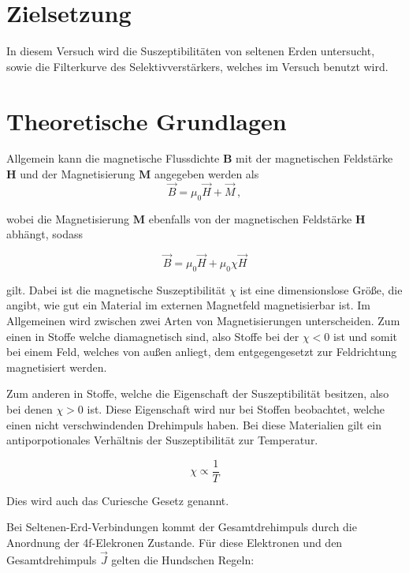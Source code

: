 \section{Zielsetzung}
In diesem Versuch wird die Suszeptibilitäten von seltenen Erden untersucht, sowie die Filterkurve des Selektivverstärkers, welches im Versuch benutzt wird.

\section{Theoretische Grundlagen}
Allgemein kann die magnetische Flussdichte $\symbf{B}$ mit der magnetischen Feldstärke $\symbf{H}$ und der Magnetisierung $\symbf{M}$ angegeben werden als
\begin{equation}
        \vec B = \mu_0 \vec H + \vec M \, ,
    \label{eqn:b}
\end{equation}

wobei die Magnetisierung $\symbf{M}$ ebenfalls von der magnetischen Feldstärke $\symbf{H}$ abhängt, sodass 

\begin{equation}
        \label{eqn:m}
        \vec B = \mu_0 \vec H + \mu_0 \chi \vec H 
\end{equation}

\noindent
gilt. Dabei ist die magnetische Suszeptibilität $\chi$ ist eine dimensionslose Größe, die angibt, wie gut ein Material im externen Magnetfeld magnetisierbar ist. 
Im Allgemeinen wird zwischen zwei Arten von Magnetisierungen unterscheiden. Zum einen in Stoffe welche diamagnetisch sind, also Stoffe bei der  $\chi < 0$ ist 
und somit bei einem Feld, welches von außen anliegt, dem entgegengesetzt zur Feldrichtung magnetisiert werden. 
\noindent

Zum anderen in Stoffe, welche die Eigenschaft der Suszeptibilität besitzen, also bei denen $\chi > 0$ ist. Diese Eigenschaft wird nur bei Stoffen beobachtet,
welche einen nicht verschwindenden Drehimpuls haben. Bei diese Materialien gilt ein antiporpotionales Verhältnis der 
Suszeptibilität zur Temperatur. 

\begin{equation}
        \chi \propto \frac{1}{T}
\end{equation}

\noindent
Dies wird auch das Curiesche Gesetz genannt. 

\noindent
Bei Seltenen-Erd-Verbindungen kommt der Gesamtdrehimpuls durch die Anordnung der 4f-Elekronen Zustande.
Für diese Elektronen und den Gesamtdrehimpuls $\vec{J}$ gelten die Hundschen Regeln:

